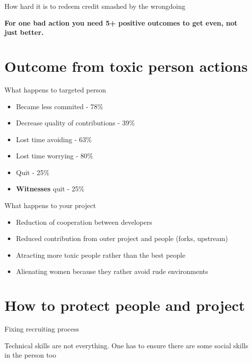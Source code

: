 \documentclass{beamer}
\begin{document}
\begin{frame}{How hard it is to redeem credit smashed by the wrongdoing}
	\begin{center}
	\textbf{For one bad action you need 5+ positive outcomes to get even, not just better.}
	\end{center}
\end{frame}

\section{Outcome from toxic person actions}

\begin{frame}[t]{What happens to targeted person}
	\begin{itemize}
	\item Became less commited - 78\%
	\item Decrease quality of contributions - 39\%
	\item Lost time avoiding - 63\%
	\item Lost time worrying - 80\%
	\item Quit - 25\%
	\item \textbf{Witnesses} quit - 25\%
	\end{itemize}
\end{frame}

\begin{frame}[t]{What happens to your project}
	\begin{itemize}
	\item Reduction of cooperation between developers
	\item Reduced contribution from outer project and people (forks, upstream)
	\item Atracting more toxic people rather than the best people
	\item Alienating women because they rather avoid rude environments
	\end{itemize}
\end{frame}

\section{How to protect people and project}

\begin{frame}{Fixing recruiting process}
	\begin{center}
	Technical skills are not everything. One has to ensure there are some social skills in the person too
	\end{center}
\end{frame}
\end{document}
